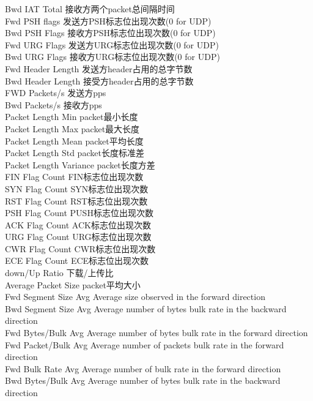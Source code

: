 Bwd IAT Total			接收方两个packet总间隔时间 \\
Fwd PSH flags			发送方PSH标志位出现次数(0 for UDP) \\
Bwd PSH Flags			接收方PSH标志位出现次数(0 for UDP)\\
Fwd URG Flags			发送方URG标志位出现次数(0 for UDP) \\
Bwd URG Flags			接收方URG标志位出现次数(0 for UDP) \\
Fwd Header Length		发送方header占用的总字节数 \\
Bwd Header Length		接受方header占用的总字节数 \\
FWD Packets/s			发送方pps \\
Bwd Packets/s			接收方pps \\
Packet Length Min 		packet最小长度 \\
Packet Length Max		packet最大长度 \\
Packet Length Mean 		packet平均长度 \\
Packet Length Std		packet长度标准差 \\
Packet Length Variance  	packet长度方差 \\
FIN Flag Count 			FIN标志位出现次数 \\
SYN Flag Count 			SYN标志位出现次数 \\
RST Flag Count 			RST标志位出现次数 \\
PSH Flag Count 			PUSH标志位出现次数 \\
ACK Flag Count 			ACK标志位出现次数 \\
URG Flag Count 			URG标志位出现次数 \\
CWR Flag Count 			CWR标志位出现次数 \\
ECE Flag Count 			ECE标志位出现次数 \\
down/Up Ratio			下载/上传比 \\
Average Packet Size 		packet平均大小 \\
Fwd Segment Size Avg 		Average size observed in the forward direction \\
Bwd Segment Size Avg 		Average number of bytes bulk rate in the backward direction \\
Fwd Bytes/Bulk Avg		Average number of bytes bulk rate in the forward direction \\
Fwd Packet/Bulk Avg		Average number of packets bulk rate in the forward direction \\
Fwd Bulk Rate Avg 		Average number of bulk rate in the forward direction \\
Bwd Bytes/Bulk Avg		Average number of bytes bulk rate in the backward direction \\
